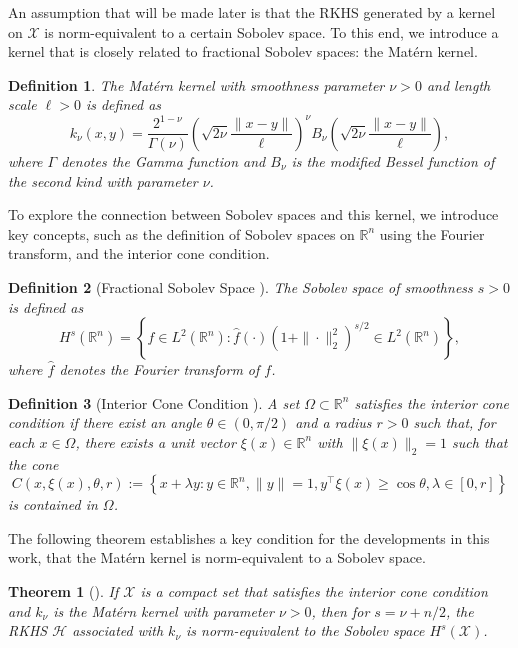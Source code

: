 \documentclass{article}
\newtheorem{defn}{Definition}
\newtheorem{theo}{Theorem}
\renewcommand{\H}{\mathcal{H}}
\newcommand{\X}{\mathcal{X}}
\begin{document}
An assumption that will be made later is that the RKHS generated by a kernel on \( \X \) is norm-equivalent to a certain Sobolev space. To this end, we introduce a kernel that is closely related to fractional Sobolev spaces: the Matérn kernel.

\begin{defn}
The Mat\'ern kernel with smoothness parameter \( \nu > 0 \) and length scale \( \ell > 0 \) is defined as
\[
k_{\nu}(x,y) = \frac{2^{1-\nu}}{\Gamma(\nu)} \left( \sqrt{2\nu} \frac{\|x-y\|}{\ell} \right)^\nu B_\nu \left( \sqrt{2\nu} \frac{\|x-y\|}{\ell} \right),
\]
where \( \Gamma \) denotes the Gamma function and \( B_\nu \) is the modified Bessel function of the second kind with parameter \( \nu \).
\end{defn}

To explore the connection between Sobolev spaces and this kernel, we introduce key concepts, such as the definition of Sobolev spaces on \( \mathbb{R}^n \) using the Fourier transform, and the interior cone condition.

\begin{defn}[Fractional Sobolev Space \cite{Adams2003SobolevSpaces}]
The Sobolev space of smoothness \( s > 0 \) is defined as
\[
H^s(\mathbb{R}^n) = \left\{ f \in L^2(\mathbb{R}^n) : \widehat{f}(\cdot)(1 + \|\cdot\|_2^2)^{s/2} \in L^2(\mathbb{R}^n) \right\},
\]
where \( \widehat{f} \) denotes the Fourier transform of \( f \).
\label{def:frac_sob}
\end{defn}

\begin{defn}[Interior Cone Condition \cite{Wendland2004ScatteredApproximation}]
A set \( \Omega \subset \mathbb{R}^n \) satisfies the interior cone condition if there exist an angle \( \theta \in (0, \pi/2) \) and a radius \( r > 0 \) such that, for each \( x \in \Omega \), there exists a unit vector \( \xi(x) \in \mathbb{R}^n \) with \( \|\xi(x)\|_2 = 1 \) such that the cone
\[
C(x, \xi(x), \theta, r) := \left\{ x + \lambda y : y \in \mathbb{R}^n, \|y\| = 1, y^\top \xi(x) \geq \cos \theta, \lambda \in [0, r] \right\}
\]
is contained in \( \Omega \).
\end{defn}

The following theorem establishes a key condition for the developments in this work, that the Mat\'ern kernel is norm-equivalent to a Sobolev space.

\begin{theo}[\cite{Tuo2016AProperties, Wendland2004ScatteredApproximation}]
If \( \X \) is a compact set that satisfies the interior cone condition and \( k_\nu \) is the Mat\'ern kernel with parameter \( \nu > 0 \), then for \( s = \nu + n/2 \), the RKHS \( \H \) associated with \( k_\nu \) is norm-equivalent to the Sobolev space \( H^s(\X) \).
\end{theo}
\end{document}
